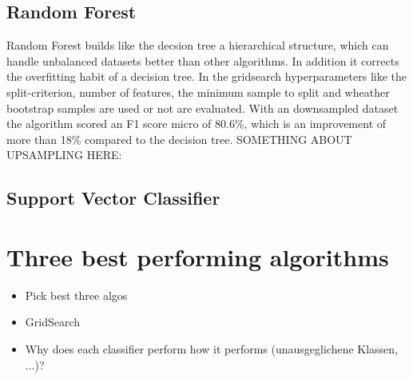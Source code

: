 \subsection{Random Forest}
Random Forest builds like the decsion tree a hierarchical structure, which can handle unbalanced datasets better than other algorithms. In addition it corrects the overfitting habit of a decision tree. In the gridsearch hyperparameters like the split-criterion, number of features, the minimum sample to split and wheather bootstrap samples are used or not are evaluated.
With an downsampled dataset the algorithm scored an F1 score micro of 80.6\%, which is an improvement of more than 18\% compared to the decision tree.
SOMETHING ABOUT UPSAMPLING HERE:

\subsection{Support Vector Classifier}

\section{Three best performing algorithms}
\begin{itemize}
	\item Pick best three algos
	\item GridSearch
	\item Why does each classifier perform how it performs (unausgeglichene Klassen, ...)?
\end{itemize}
